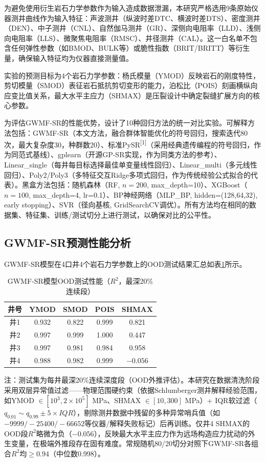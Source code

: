 \documentclass[a4paper,12pt]{ctexart}
\begin{document}
为避免使用衍生岩石力学参数作为输入造成数据泄漏，本研究严格选用9条原始仪器测井曲线作为输入特征：声波测井（纵波时差DTC、横波时差DTS）、密度测井（DEN）、中子测井（CNL）、自然伽马测井（GR）、深侧向电阻率（LLD）、浅侧向电阻率（LLS）、微聚焦电阻率（RMSC）、井径测井（CAL）。这一白名单不包含任何弹性参数（如BMOD、BULK等）或脆性指数（BRIT/BRITT）等衍生量，确保输入特征均为仪器直接测量值。

实验的预测目标为4个岩石力学参数：杨氏模量（YMOD）反映岩石的刚度特性，剪切模量（SMOD）表征岩石抵抗剪切变形的能力，泊松比（POIS）刻画横纵向应变比值关系，最大水平主应力（SHMAX）是压裂设计中确定裂缝扩展方向的核心参数。

为评估GWMF-SR的性能优势，设计了10种回归方法的统一对比实验。可解释方法包括：GWMF-SR（本文方法，融合群体智能优化的符号回归，搜索迭代80次，最大复杂度30，种群数20）、标准PySR\textsuperscript{[1]}（采用经典遗传编程的符号回归，作为同范式基线）、gplearn（开源GP-SR实现，作为同类方法的参考）、Linear\_single（每井每目标选择最佳单变量线性回归）、Linear\_multi（多元线性回归）、Poly2/Poly3（多特征交互Ridge多项式回归，作为传统经验公式拟合的代表）。黑盒方法包括：随机森林（RF, $n=200$, max\_depth=10）、XGBoost（$n=100$, max\_depth=4, lr=0.1）、BP神经网络（MLP\_BP, hidden=(128,64,32), early stopping）、SVR（径向基核, GridSearchCV调优）。所有方法均在相同的数据集、特征集、训练/测试切分上进行测试，以确保对比的公平性。

\subsection{GWMF-SR预测性能分析}

GWMF-SR模型在4口井4个岩石力学参数上的OOD测试结果汇总如表\ref{tab:r2}所示。

\begin{table}[htbp]
  \centering
  \caption{GWMF-SR模型OOD测试性能（$R^2$，最深20\%连续段）}
  \label{tab:r2}
  \begin{tabular}{ccccc}
    \toprule
    井号 & YMOD & SMOD & POIS & SHMAX \\
    \midrule
    井1 & 0.932 & 0.822 & 0.999 & 0.821 \\
    井2 & 0.997 & 0.999 & 1.000 & 0.447 \\
    井3 & 0.997 & 0.981 & 0.984 & 0.958 \\
    井4 & 0.988 & 0.982 & 0.999 & $-0.056$ \\
    \bottomrule
  \end{tabular}
  \begin{flushleft}
    \small 注：测试集为每井最深20\%连续深度段（OOD外推评估）。本研究在数据清洗阶段采用双层异常值过滤——物理范围硬约束（依据Schlumberger测井解释经验范围，如YMOD $\in[10^3,2\!\times\!10^5]$ MPa、SHMAX $\in[10,300]$ MPa）+ IQR软过滤（$q_{0.01}\!\sim\!q_{0.99}\!\pm\!5\!\times\!IQR$），剔除测井数据中残留的多种异常哨兵值（如$-9999/-25400/-66652$等仪器/解释失败标记）后再训练。仅井4 SHMAX的OOD段$R^2$略微为负（$-0.056$），反映最大水平主应力作为远场构造应力扰动的外生变量，在极端外推段存在固有难度。常规随机80/20切分对照下GWMF-SR各组合$R^2$均$\geq 0.94$（中位数0.998）。
  \end{flushleft}
\end{table}
\end{document}
